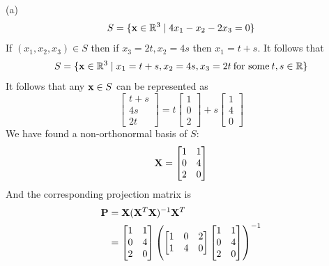 \documentclass[a4paper, 12pt]{article}
\begin{document}
\begin{problem} [Problem 2]
\end{problem}
\begin{solution}
    (a)
    \[
        S = \{\mathbf{x} \in \mathbb{R}^3 \mid 4x_1 - x_2 - 2x_3 = 0\}
    \]
    If $(x_1, x_2, x_3) \in S$ then if $x_3 = 2t, x_2 = 4s$ then $x_1 = t + s$. It follows that \[
        S = \{\mathbf{x} \in \mathbb{R}^3 \mid x_1 = t + s, x_2 = 4s, x_3 = 2t \:\text{for some}\: t, s \in \mathbb{R}\}
    \]
    It follows that any $\mathbf{x} \in S$ can be represented as \[
        \begin{bmatrix}
            t + s \\
            4s    \\
            2t
        \end{bmatrix} =     t \begin{bmatrix}
            1 \\ 0 \\ 2
        \end{bmatrix} + s \begin{bmatrix}
            1 \\ 4 \\ 0
        \end{bmatrix}
    \]
    We have found a non-orthonormal basis of $S$: \[
        \mathbf{X} = \begin{bmatrix}
            1 & 1 \\
            0 & 4 \\
            2 & 0
        \end{bmatrix}
    \]
    And the corresponding projection matrix is
    \begin{align*}
        \bfP & = \bfX(\bfX^T \bfX)^{-1}\bfX^T \\
             & = \begin{bmatrix}
                     1 & 1 \\
                     0 & 4 \\
                     2 & 0
                 \end{bmatrix}
        \left(\begin{bmatrix}
                  1 & 0 & 2 \\
                  1 & 4 & 0
              \end{bmatrix}
        \begin{bmatrix}
            1 & 1 \\
            0 & 4 \\
            2 & 0
        \end{bmatrix}
        \right)^{-1}

\end{align*}
\end{solution}
\end{document}
